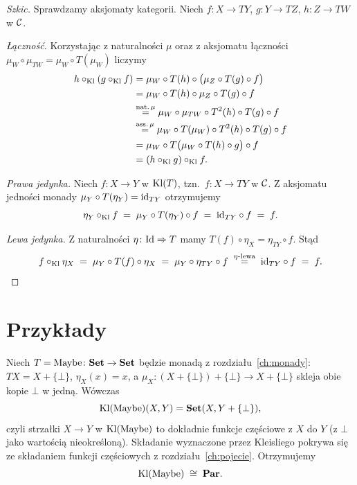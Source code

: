 \begin{proof}[Szkic]
Sprawdzamy aksjomaty kategorii. Niech $f\colon X\to TY$, $g\colon Y\to TZ$, $h\colon Z\to TW$ w $\mathcal{C}$.

\emph{Łączność.} Korzystając z naturalności $\mu$ oraz z aksjomatu łączności $\mu_W\circ\mu_{TW} = \mu_W\circ T(\mu_W)$ liczymy
\begin{align*}
h\circ_{\mathrm{Kl}}(g\circ_{\mathrm{Kl}} f) &= \mu_W \circ T(h) \circ \bigl(\mu_Z\circ T(g)\circ f\bigr) \\
 &= \mu_W \circ T(h)\circ \mu_Z \circ T(g)\circ f \\
 &\stackrel{\mathrm{nat.}\,\mu}{=} \mu_W \circ \mu_{TW} \circ T^2(h) \circ T(g)\circ f \\
 &\stackrel{\mathrm{ass.}\,\mu}{=} \mu_W \circ T(\mu_W) \circ T^2(h) \circ T(g)\circ f \\
 &= \mu_W \circ T\bigl(\mu_W \circ T(h)\circ g\bigr) \circ f \\
 &= (h\circ_{\mathrm{Kl}} g)\circ_{\mathrm{Kl}} f.
\end{align*}

\emph{Prawa jedynka.} Niech $f\colon X\to Y$ w $\mathrm{Kl}(T)$, tzn.\ $f\colon X\to TY$ w $\mathcal{C}$. Z aksjomatu jedności monady $\mu_Y \circ T(\eta_Y) = \mathrm{id}_{TY}$ otrzymujemy
\[
\eta_Y \circ_{\mathrm{Kl}} f \;=\; \mu_Y \circ T(\eta_Y) \circ f \;=\; \mathrm{id}_{TY}\circ f \;=\; f.
\]

\emph{Lewa jedynka.} Z naturalności $\eta\colon \mathrm{Id}\Rightarrow T$ mamy $T(f)\circ \eta_X = \eta_{TY}\circ f$. Stąd
\[
f \circ_{\mathrm{Kl}} \eta_X \;=\; \mu_Y \circ T(f) \circ \eta_X \;=\; \mu_Y \circ \eta_{TY}\circ f \;\stackrel{\eta\text{-lewa}}{=}\; \mathrm{id}_{TY}\circ f \;=\; f. \qedhere
\]
\end{proof}

\section{Przykłady}

\begin{przyklad}
Niech $T = \mathrm{Maybe}\colon \mathbf{Set}\to\mathbf{Set}$ będzie monadą z rozdziału~\ref{ch:monady}: $TX = X+\{\bot\}$, $\eta_X(x)=x$, a $\mu_X\colon (X+\{\bot\})+\{\bot\}\to X+\{\bot\}$ skleja obie kopie $\bot$ w jedną. Wówczas
\[
\mathrm{Kl}(\mathrm{Maybe})(X,Y) = \mathbf{Set}(X, Y+\{\bot\}),
\]
czyli strzałki $X\to Y$ w $\mathrm{Kl}(\mathrm{Maybe})$ to dokładnie funkcje częściowe z $X$ do $Y$ (z $\bot$ jako wartością nieokreśloną). Składanie wyznaczone przez Kleisliego pokrywa się ze składaniem funkcji częściowych z rozdziału~\ref{ch:pojecie}. Otrzymujemy
\[
\mathrm{Kl}(\mathrm{Maybe}) \;\cong\; \mathbf{Par}.
\]
\end{przyklad}

